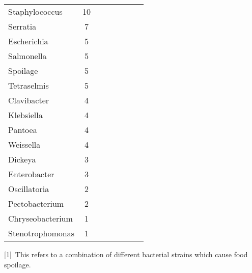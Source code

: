 \documentclass[11pt]{article}
\begin{document}
\begin{table}[htbp]
\begin{tabularx}{\linewidth}{l*{7}{c}}
		Staphylococcus & 10 \\
		Serratia & 7 \\
		Escherichia & 5 \\
		Salmonella & 5 \\
		Spoilage & 5 \\
		Tetraselmis & 5 \\
		Clavibacter & 4 \\
		Klebsiella & 4 \\
		Pantoea & 4 \\
		Weissella & 4 \\
		Dickeya & 3 \\
		Enterobacter & 3 \\
		Oscillatoria & 2 \\
		Pectobacterium & 2 \\
		Chryseobacterium & 1 \\
		Stenotrophomonas & 1 \\
		\bottomrule
	\end{tabularx}
		
		[1]\ This refers to a combination of different bacterial strains which cause food spoilage.
	\end{table}
	
\end{document}
